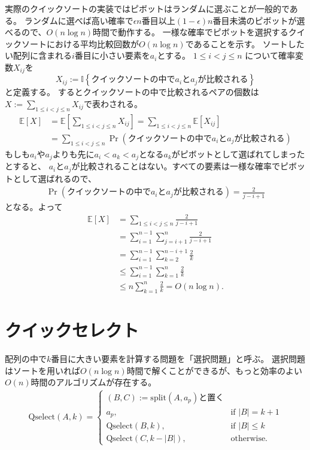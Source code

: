 \documentclass[a4paper,twoside,onecolumn,openany,article,10pt]{memoir}
\theoremstyle{remark}
\begin{document}
実際のクイックソートの実装ではピボットはランダムに選ぶことが一般的である。
ランダムに選べば高い確率で$\epsilon n$番目以上$(1-\epsilon) n$番目未満のピボットが選べるので、$O(n\log n)$時間で動作する。
一様な確率でピボットを選択するクイックソートにおける平均比較回数が$O(n\log n)$であることを示す。
ソートしたい配列に含まれる$i$番目に小さい要素を$a_i$とする。
$1\le i<j\le n$ について確率変数$X_{ij}$を
\begin{equation*}
X_{ij} := \mathbb{I}\left\{\text{クイックソートの中で$a_i$と$a_j$が比較される}\right\}
\end{equation*}
と定義する。
するとクイックソートの中で比較されるペアの個数は$X:=\sum_{1\le i<j\le n} X_{ij}$で表わされる。
\begin{align*}
\mathbb{E}[X] &=
\mathbb{E}\left[\sum_{1\le i<j\le n} X_{ij}\right]
=
\sum_{1\le i<j\le n} \mathbb{E}[X_{ij}]\\
&=
\sum_{1\le i<j\le n} \Pr\left(\text{クイックソートの中で$a_i$と$a_j$が比較される}\right)
\end{align*}
もしも$a_i$や$a_j$よりも先に$a_i < a_k < a_j$となる$a_k$がピボットとして選ばれてしまったとすると、
$a_i$と$a_j$が比較されることはない。すべての要素は一様な確率でピボットとして選ばれるので、
\begin{align*}
\Pr\left(\text{クイックソートの中で$a_i$と$a_j$が比較される}\right) = \frac2{j-i+1}
\end{align*}
となる。よって
\begin{align*}
\mathbb{E}[X] &=
\sum_{1\le i<j\le n} \frac2{j-i+1}\\
&= \sum_{i=1}^{n-1} \sum_{j=i+1}^n \frac2{j-i+1}\\
&= \sum_{i=1}^{n-1} \sum_{k=2}^{n-i+1} \frac2{k}\\
&\le \sum_{i=1}^{n-1} \sum_{k=1}^{n} \frac2{k}\\
&\le n\sum_{k=1}^{n} \frac2{k} = O(n\log n).
\end{align*}

\section{クイックセレクト}
配列の中で$k$番目に大きい要素を計算する問題を「選択問題」と呼ぶ。
選択問題はソートを用いれば$O(n\log n)$時間で解くことができるが、もっと効率のよい$O(n)$時間のアルゴリズムが存在する。
\begin{align*}
\mathrm{Qselect}(A, k) =
\begin{cases}
(B, C) := \mathrm{split}(A, a_p)\text{と置く}\\
a_p,& \text{if } |B| = k+1\\
\mathrm{Qselect}(B, k),&\text{if } |B| \le k\\
\mathrm{Qselect}(C, k-|B|),&\text{otherwise.}
\end{cases}
\end{align*}
\end{document}
